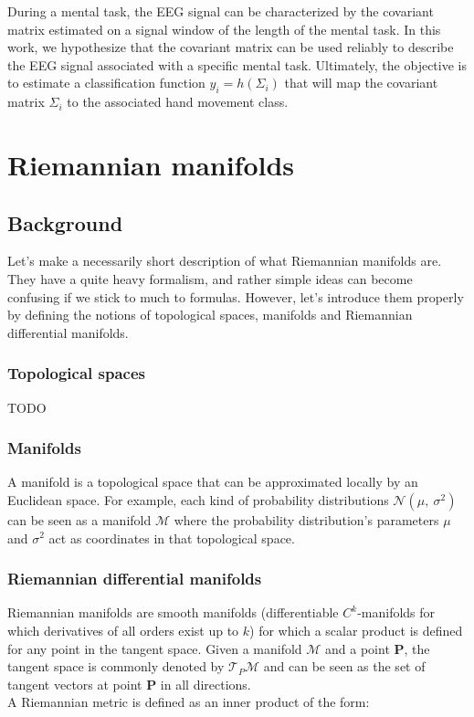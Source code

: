 \documentclass[a4paper,11pt]{report}
\begin{document}
During a mental task, the EEG signal can be characterized by the covariant matrix estimated on a signal window of the length of the mental task. In this work, we hypothesize that the covariant matrix can be used reliably to describe the EEG signal associated with a specific mental task. Ultimately, the objective is to estimate a classification function $y_i = h(\Sigma_{i})$ that will map the covariant matrix $\Sigma_{i}$ to the associated hand movement class.



\chapter{Riemannian manifolds}

\section{Background}

Let's make a necessarily short description of what Riemannian manifolds are. They have a quite heavy
formalism, and rather simple ideas can become confusing if we stick to much to formulas. However, let's introduce them
properly by defining the notions of topological spaces, manifolds and Riemannian differential manifolds.

\subsection{Topological spaces}

TODO

\subsection{Manifolds}

A manifold is a topological space that can be approximated locally by an Euclidean space. For example, each kind of probability distributions $\mathcal{N}(\mu,\ \sigma^2)$ can be seen as a manifold $\mathcal{M}$ where the probability distribution's parameters $\mu$ and $\sigma^2$ act as coordinates in that topological space. 

\subsection{Riemannian differential manifolds}

Riemannian manifolds are smooth manifolds (differentiable $C^k$-manifolds for which derivatives of all orders exist up to $k$)
for which a scalar product is defined for any point in the tangent space. Given a manifold $\mathcal{M}$ and a point $\textbf{P}$,
the tangent space is commonly denoted by $\mathcal{T}_P \mathcal{M}$ and can be seen as the set of tangent vectors at point $\textbf{P}$ in all directions.\\
A Riemannian metric is defined as an inner product of the form:
\end{document}
